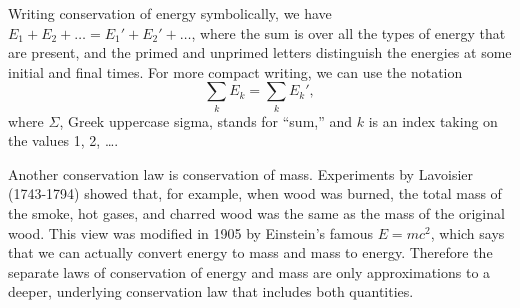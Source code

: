 Writing conservation of energy symbolically, we have
$E_1+E_2+\ldots=E_1'+E_2'+\ldots$, where the sum is over all the types
of energy that are present, and the primed and unprimed letters distinguish the energies at some
initial and final times. For more compact writing, we can use the notation
\begin{equation}
  \sum_k E_k = \sum_k E_k',
\end{equation}
where $\Sigma$, Greek uppercase sigma, stands for ``sum,'' and $k$ is an index taking
on the values 1, 2, \ldots.

Another conservation law is conservation of mass. Experiments by Lavoisier (1743-1794)
showed that, for example, when wood was burned, the total mass of the smoke, hot gases,
and charred wood was the same as the mass of the original wood.
This view was modified in 1905 by Einstein's famous
$E=mc^2$, which says that we can actually convert energy to mass and mass to energy.
Therefore the separate laws of conservation of energy and mass are only approximations
to a deeper, underlying conservation law that includes both quantities.
